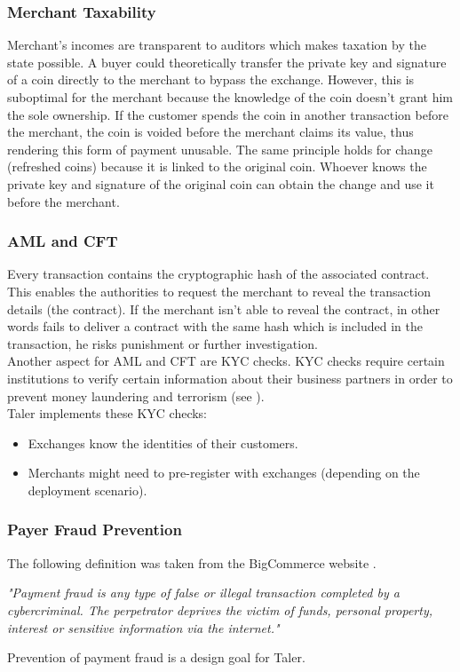 \subsubsection{Merchant Taxability}
Merchant's incomes are transparent to auditors which makes taxation by the state possible.
\newline
A buyer could theoretically transfer the private key and signature of a coin directly to the merchant to bypass the exchange.
However, this is suboptimal for the merchant because the knowledge of the coin doesn't grant him the sole ownership.
If the customer spends the coin in another transaction before the merchant, the coin is voided before the merchant claims its value, thus rendering this form of payment unusable.
The same principle holds for change (refreshed coins) because it is linked to the original coin.
Whoever knows the private key and signature of the original coin can obtain the change and use it before the merchant.

\subsubsection{\acl{AML} and \acl{CFT}}
Every transaction contains the cryptographic hash of the associated contract.
This enables the authorities to request the merchant to reveal the transaction details (the contract).
If the merchant isn't able to reveal the contract, in other words fails to deliver a contract with the same hash which is included in the transaction, he risks punishment or further investigation.
\\Another aspect for \ac{AML} and \ac{CFT} are \ac{KYC} checks.
\acl{KYC} checks require certain institutions to verify certain information about their business partners in order to prevent money laundering and terrorism (see \cite{dewiki:205456999}).
\\\acl{Taler} implements these \ac{KYC} checks:
\begin{itemize}
    \item Exchanges know the identities of their customers.
    \item Merchants might need to pre-register with exchanges (depending on the deployment scenario).
\end{itemize}

\subsubsection{Payer Fraud Prevention}
The following definition was taken from the BigCommerce website \cite{website:bigcommerce-payment-fraud}.
\begin{center}
    \textit{
        "Payment fraud is any type of false or illegal transaction completed by a cybercriminal. The perpetrator deprives the victim of funds, personal property, interest or sensitive information via the internet."
    }
\end{center}
Prevention of payment fraud is a design goal for \acl{Taler}.

